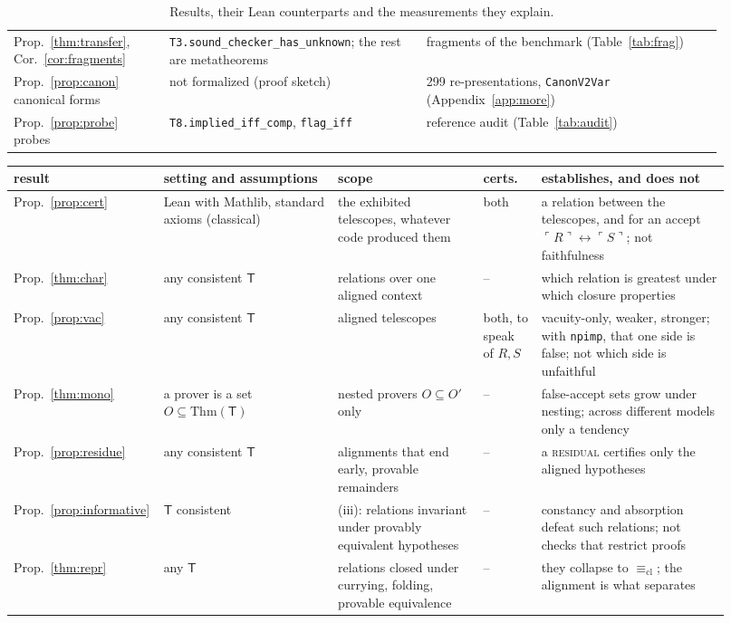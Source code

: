 \documentclass[10pt]{article}
\theoremstyle{definition}
\newcommand{\T}{\mathsf{T}}
\newcommand{\Cl}[1]{\ulcorner #1 \urcorner}
\newcommand{\Ecl}{\mathrel{\equiv_{\mathrm{cl}}}}
\newcommand{\V}[1]{\textsc{#1}}
\begin{document}
\begin{table}[h]
\begin{tabular}{p{0.2\linewidth}p{0.33\linewidth}p{0.38\linewidth}}
Prop.~\ref{thm:transfer}, Cor.~\ref{cor:fragments} & \texttt{T3.sound\_checker\_has\_unknown}; the rest are metatheorems & fragments of the benchmark (Table~\ref{tab:frag})\\
Prop.~\ref{prop:canon} canonical forms & not formalized (proof sketch) & 299 re-presentations, \texttt{CanonV2Var} (Appendix~\ref{app:more})\\
Prop.~\ref{prop:probe} probes & \texttt{T8.implied\_iff\_comp}, \texttt{flag\_iff} & reference audit (Table~\ref{tab:audit})\\
\bottomrule
\end{tabular}
\caption{Results, their Lean counterparts and the measurements they explain.}
\label{tab:theory}
\end{table}

\begin{table}[h]
\centering\footnotesize\setlength{\tabcolsep}{3pt}
\begin{tabular}{p{0.14\linewidth}p{0.24\linewidth}p{0.2\linewidth}p{0.08\linewidth}p{0.26\linewidth}}
\toprule
result & setting and assumptions & scope & certs. & establishes, and does not\\
\midrule
Prop.~\ref{prop:cert} & Lean with Mathlib, standard axioms (classical) & the exhibited telescopes, whatever code produced them & both & a relation between the telescopes, and for an accept $\Cl R\leftrightarrow\Cl S$; not faithfulness\\
Prop.~\ref{thm:char} & any consistent $\T$ & relations over one aligned context & -- & which relation is greatest under which closure properties\\
Prop.~\ref{prop:vac} & any consistent $\T$ & aligned telescopes & both, to speak of $R,S$ & vacuity-only, weaker, stronger; with \texttt{npimp}, that one side is false; not which side is unfaithful\\
Prop.~\ref{thm:mono} & a prover is a set $O\subseteq\mathrm{Thm}(\T)$ & nested provers $O\subseteq O'$ only & -- & false-accept sets grow under nesting; across different models only a tendency\\
Prop.~\ref{prop:residue} & any consistent $\T$ & alignments that end early, provable remainders & -- & a \V{residual} certifies only the aligned hypotheses\\
Prop.~\ref{prop:informative} & $\T$ consistent & (iii): relations invariant under provably equivalent hypotheses & -- & constancy and absorption defeat such relations; not checks that restrict proofs\\
Prop.~\ref{thm:repr} & any $\T$ & relations closed under currying, folding, provable equivalence & -- & they collapse to $\Ecl$; the alignment is what separates\\

\end{tabular}
\end{table}
\end{document}
